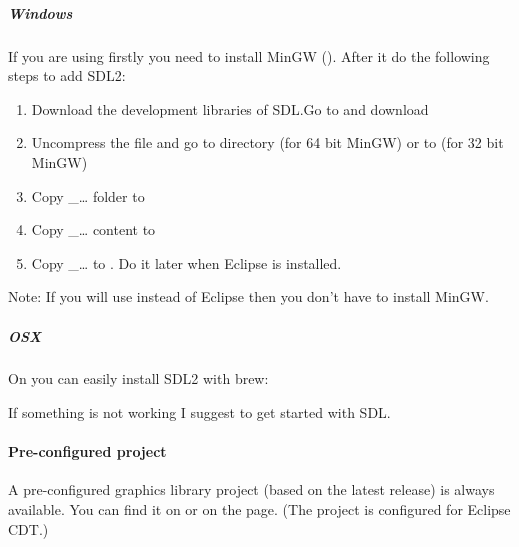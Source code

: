 \documentclass[letterpaper,10pt,english]{sphinxmanual}
\begin{document}
\subparagraph{Windows}
\label{\detokenize{get-started/pc-simulator:windows}}
If you are using  firstly you need to install MinGW (). After it do the following steps to add SDL2:
\begin{enumerate}
\def\theenumi{\arabic{enumi}}
\def\labelenumi{\theenumi .}
\makeatletter\def\p@enumii{\p@enumi \theenumi .}\makeatother
\item {} 
Download the development libraries of SDL.Go to  and download 

\item {} 
Uncompress the file and go to  directory (for 64 bit MinGW) or to  (for 32 bit MinGW)

\item {} 
Copy \_… folder to 

\item {} 
Copy \_… content to 

\item {} 
Copy \_… to .  Do it later when Eclipse is installed.

\end{enumerate}

Note: If you will use  instead of Eclipse then you don’t have to install MinGW.


\subparagraph{OSX}
\label{\detokenize{get-started/pc-simulator:osx}}
On  you can easily install SDL2 with brew: 

If something is not working I suggest  to get started with SDL.


\paragraph{Pre-configured project}
\label{\detokenize{get-started/pc-simulator:pre-configured-project}}
A pre-configured graphics library project (based on the latest release) is always available.
You can find it on  or on the  page.
(The project is configured for Eclipse CDT.)
\end{document}
